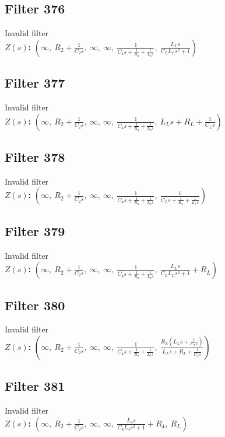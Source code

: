\documentclass{article}
\begin{document}
\subsection*{Filter 376}
Invalid filter \\ 
\textbf{$Z(s)$:} $\left( \infty, \  R_{2} + \frac{1}{C_{2} s}, \  \infty, \  \infty, \  \frac{1}{C_{4} s + \frac{1}{R_{4}} + \frac{1}{L_{4} s}}, \  \frac{L_{L} s}{C_{L} L_{L} s^{2} + 1}\right)$ \\ 
\subsection*{Filter 377}
Invalid filter \\ 
\textbf{$Z(s)$:} $\left( \infty, \  R_{2} + \frac{1}{C_{2} s}, \  \infty, \  \infty, \  \frac{1}{C_{4} s + \frac{1}{R_{4}} + \frac{1}{L_{4} s}}, \  L_{L} s + R_{L} + \frac{1}{C_{L} s}\right)$ \\ 
\subsection*{Filter 378}
Invalid filter \\ 
\textbf{$Z(s)$:} $\left( \infty, \  R_{2} + \frac{1}{C_{2} s}, \  \infty, \  \infty, \  \frac{1}{C_{4} s + \frac{1}{R_{4}} + \frac{1}{L_{4} s}}, \  \frac{1}{C_{L} s + \frac{1}{R_{L}} + \frac{1}{L_{L} s}}\right)$ \\ 
\subsection*{Filter 379}
Invalid filter \\ 
\textbf{$Z(s)$:} $\left( \infty, \  R_{2} + \frac{1}{C_{2} s}, \  \infty, \  \infty, \  \frac{1}{C_{4} s + \frac{1}{R_{4}} + \frac{1}{L_{4} s}}, \  \frac{L_{L} s}{C_{L} L_{L} s^{2} + 1} + R_{L}\right)$ \\ 
\subsection*{Filter 380}
Invalid filter \\ 
\textbf{$Z(s)$:} $\left( \infty, \  R_{2} + \frac{1}{C_{2} s}, \  \infty, \  \infty, \  \frac{1}{C_{4} s + \frac{1}{R_{4}} + \frac{1}{L_{4} s}}, \  \frac{R_{L} \left(L_{L} s + \frac{1}{C_{L} s}\right)}{L_{L} s + R_{L} + \frac{1}{C_{L} s}}\right)$ \\ 
\subsection*{Filter 381}
Invalid filter \\ 
\textbf{$Z(s)$:} $\left( \infty, \  R_{2} + \frac{1}{C_{2} s}, \  \infty, \  \infty, \  \frac{L_{4} s}{C_{4} L_{4} s^{2} + 1} + R_{4}, \  R_{L}\right)$ \\ 
\end{document}
